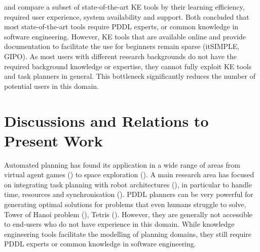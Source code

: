 \cite{shah2013knowledge} and \cite{jilani2014automated} compare a subset of state-of-the-art KE tools by their learning efficiency, required user experience, system availability and support.
Both concluded that most state-of-the-art tools require PDDL experts, or common knowledge in software engineering.
However, KE tools that are available online and provide documentation to facilitate the use for beginners remain sparse (\eg itSIMPLE, GIPO).
As most users with different research backgrounds do not have the required background knowledge or expertise, they cannot fully exploit KE tools and task planners in general.
This bottleneck significantly reduces the number of potential users in this domain.


\section{Discussions and Relations to Present Work}\label{subsec:APdiscussions}
Automated planning has found its application in a wide range of areas from virtual agent games (\cite{fernandez2006planning}) to space exploration (\cite{backes2004multi,bresina2005activity}).
A main research area has focused on integrating task planning with robot architectures (\cite{cashmore2015rosplan}), in particular to handle time, resources and synchronisation (\cite{di2014planner,dvorak2014flexible}).
PDDL planners can be very powerful for generating optimal solutions for problems that even humans struggle to solve, \eg Tower of Hanoi problem (\cite{hanoiPddlGit}), Tetris (\cite{ipc14site}).
However, they are generally not accessible to end-users who do not have experience in this domain. 
While knowledge engineering tools facilitate the modelling of planning domains, they still require PDDL experts or common knowledge in software engineering.

